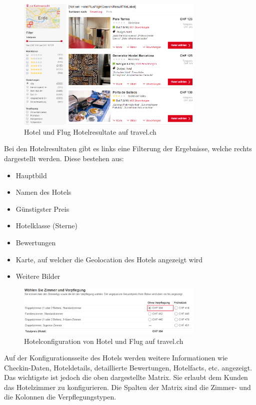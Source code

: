 \begin{figure}[H]
	\centering
	\includegraphics[width=0.8\textwidth]{images/travel-results.png}
	\caption{Hotel und Flug Hotelresultate auf travel.ch}
	\label{fig:recherche:travelch:results}
\end{figure}
Bei den Hotelresultaten gibt es links eine Filterung der Ergebnisse, welche rechts dargestellt werden. Diese bestehen aus:
\begin{itemize}
\item Hauptbild
\item Namen des Hotels
\item Günstigster Preis
\item Hotelklasse (Sterne)
\item Bewertungen
\item Karte, auf welcher die Geolocation des Hotels angezeigt wird
\item Weitere Bilder
\end{itemize}

\begin{figure}[H]
	\centering
	\includegraphics[width=0.8\textwidth]{images/travel-configuration.png}
	\caption{Hotelconfiguration von Hotel und Flug auf travel.ch}
	\label{fig:recherche:travelch:configuration}
\end{figure}
Auf der Konfigurationsseite des Hotels werden weitere Informationen wie Checkin-Daten, Hoteldetails, detaillierte Bewertungen, Hotelfacts, etc. angezeigt. Das wichtigste ist jedoch die oben dargestellte Matrix. Sie erlaubt dem Kunden das Hotelzimmer zu konfigurieren. Die Spalten der Matrix sind die Zimmer- und die Kolonnen die Verpflegungstypen.

